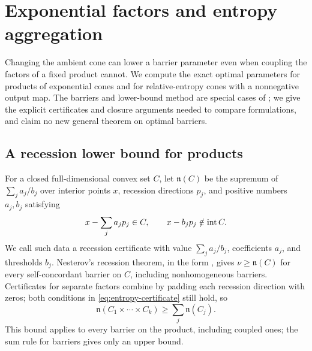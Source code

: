 \section{Exponential factors and entropy aggregation}
\label{sec:entropy-aggregation}

Changing the ambient cone can lower a barrier parameter even when
coupling the factors of a fixed product cannot.  We compute the exact
optimal parameters for products of exponential cones and for
relative-entropy cones with a nonnegative output map.  The barriers and
lower-bound method are special cases of \citet{FS2023}; we give the
explicit certificates and closure arguments needed to compare
formulations, and claim no new general theorem on optimal barriers.

\subsection{A recession lower bound for products}

For a closed full-dimensional convex set $C$, let $\mathfrak n(C)$ be the
supremum of $\sum_j a_j/b_j$ over interior points $x$, recession directions
$p_j$, and positive numbers $a_j,b_j$ satisfying
\begin{equation}\label{eq:entropy-certificate}
 x-\sum_j a_jp_j\in C,\qquad x-b_jp_j\notin\operatorname{int} C.
\end{equation}
We call such data a recession certificate with value $\sum_j a_j/b_j$,
coefficients $a_j$, and thresholds $b_j$.
Nesterov's recession theorem, in the form
\citep[Theorem 3.9]{FS2023}, gives $\nu\geq\mathfrak n(C)$ for every
self-concordant barrier on $C$, including nonhomogeneous barriers.
Certificates for separate factors combine by padding each recession
direction with zeros; both conditions in \eqref{eq:entropy-certificate}
still hold, so
\begin{equation}\label{eq:entropy-tensorization}
 \mathfrak n(C_1\times\cdots\times C_k)
 \geq\sum_j\mathfrak n(C_j).
\end{equation}
This bound applies to every barrier on the product, including coupled
ones; the sum rule for barriers gives only an upper bound.

